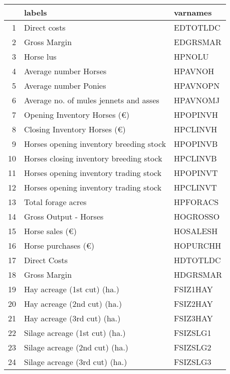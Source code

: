 \documentclass{article}\usepackage{graphicx, color}
\begin{document}
\begin{flushleft}
\newpage
\begin{table}[ht]
\begin{center}
\begin{tabular}{rll}
  \hline
 & labels & varnames \\ 
  \hline
1 & Direct costs & EDTOTLDC \\ 
  2 & Gross Margin & EDGRSMAR \\ 
  3 & Horse lus & HPNOLU \\ 
  4 & Average number Horses & HPAVNOH \\ 
  5 & Average number Ponies & HPAVNOPN \\ 
  6 & Average no. of mules jennets and asses & HPAVNOMJ \\ 
  7 & Opening Inventory Horses      (€) & HPOPINVH \\ 
  8 & Closing Inventory Horses      (€) & HPCLINVH \\ 
  9 & Horses opening inventory breeding stock & HPOPINVB \\ 
  10 & Horses closing inventory breeding stock & HPCLINVB \\ 
  11 & Horses opening inventory trading stock & HPOPINVT \\ 
  12 & Horses opening inventory trading stock & HPCLINVT \\ 
  13 & Total forage acres & HPFORACS \\ 
  14 & Gross Output - Horses & HOGROSSO \\ 
  15 & Horse sales        (€) & HOSALESH \\ 
  16 & Horse purchases    (€) & HOPURCHH \\ 
  17 & Direct Costs & HDTOTLDC \\ 
  18 & Gross Margin & HDGRSMAR \\ 
  19 & Hay acreage (1st cut)    (ha.) & FSIZ1HAY \\ 
  20 & Hay acreage (2nd cut)    (ha.) & FSIZ2HAY \\ 
  21 & Hay acreage (3rd cut)    (ha.) & FSIZ3HAY \\ 
  22 & Silage acreage (1st cut) (ha.) & FSIZSLG1 \\ 
  23 & Silage acreage (2nd cut) (ha.) & FSIZSLG2 \\ 
  24 & Silage acreage (3rd cut) (ha.) & FSIZSLG3 \\ 
   \hline
\end{tabular}
\end{center}
\end{table}




\end{flushleft}
\end{document}

